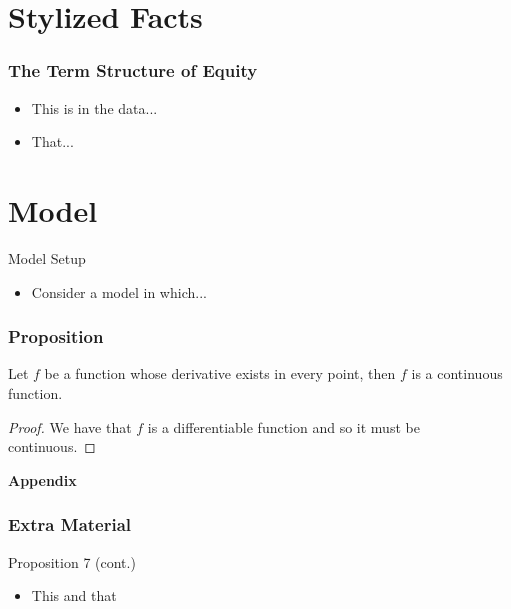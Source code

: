 \documentclass[ignorenonframetext, 9pt]{beamer}
\begin{document}
\section{Stylized Facts}


\begin{frame}
  \frametitle{The Term Structure of Equity}
  \begin{itemize}
  \item This is in the data...
  \item That...
  \end{itemize}
\label{slide:stylized_facts}
\end{frame}

\section{Model}


\begin{frame}{Model Setup}
\begin{itemize}
\item Consider a model in which...
\end{itemize}
\label{slide:state-space-framework}
\hyperlink{slide:stylized_facts}{}
\end{frame}



\begin{frame}
  \frametitle{Proposition}

  \begin{proposition}
    Let \(f\) be a function whose derivative exists in every point, then \(f\) is 
    a continuous function.
  \end{proposition}
  \begin{proof}
    We have that \(f\) is a differentiable function and so it must be continuous.
  \end{proof}
  

\end{frame}

\appendix
\begin{frame}
  \centering
  \textbf{Appendix}
\end{frame}

\begin{frame}
  \frametitle{Extra Material}
  \label{slide:prop7}
\alert{Proposition 7 (cont.)}
\begin{itemize}
\item This and that
\end{itemize}
\end{frame}


%   
\end{document}
